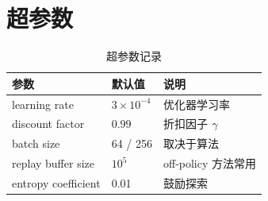 \section{超参数}

\begin{table}[H]
  \centering
  \begin{tabular}{lll}
    \toprule
    参数 & 默认值 & 说明 \\
    \midrule
    learning rate & $3\times10^{-4}$ & 优化器学习率 \\
    discount factor & $0.99$ & 折扣因子 $\gamma$ \\
    batch size & 64 / 256 & 取决于算法 \\
    replay buffer size & $10^5$ & off-policy 方法常用 \\
    entropy coefficient & 0.01 & 鼓励探索 \\
    \bottomrule
  \end{tabular}
  \caption{超参数记录}
  \label{tab:hyperparameters}
\end{table}
